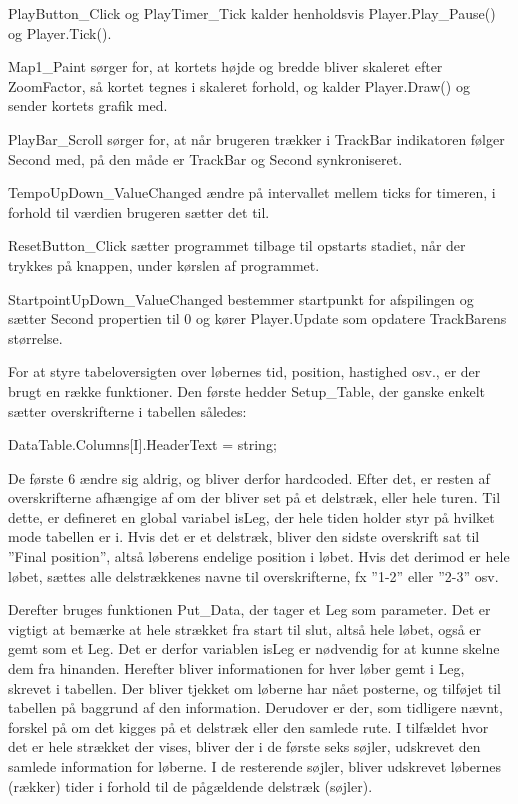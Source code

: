 PlayButton\_Click og PlayTimer\_Tick kalder henholdsvis Player.Play\_Pause() og Player.Tick().

Map1\_Paint sørger for, at kortets højde og bredde bliver skaleret efter ZoomFactor, så kortet tegnes i skaleret forhold, og kalder Player.Draw() og sender kortets grafik med.

PlayBar\_Scroll sørger for, at når brugeren trækker i TrackBar indikatoren følger Second med, på den måde er TrackBar og Second synkroniseret.

TempoUpDown\_ValueChanged ændre på intervallet mellem ticks for timeren, i forhold til værdien brugeren sætter det til. 

ResetButton\_Click sætter programmet tilbage til opstarts stadiet, når der trykkes på knappen, under kørslen af programmet. 

StartpointUpDown\_ValueChanged bestemmer startpunkt for afspilingen og sætter Second propertien til 0 og kører Player.Update som opdatere TrackBarens størrelse.

For at styre tabeloversigten over løbernes tid, position, hastighed osv., er der brugt en række funktioner. 
Den første hedder Setup\_Table, der ganske enkelt sætter overskrifterne i tabellen således:

DataTable.Columns[I].HeaderText = string;

De første 6 ændre sig aldrig, og bliver derfor hardcoded. Efter det, er resten af overskrifterne afhængige af om der bliver set på et delstræk, eller hele turen.  Til dette, er defineret en global variabel isLeg, der hele tiden holder styr på hvilket mode tabellen er i. Hvis det er et delstræk, bliver den sidste overskrift sat til ”Final position”, altså løberens endelige position i løbet. Hvis det derimod er hele løbet, sættes alle delstrækkenes navne til overskrifterne, fx ”1-2” eller ”2-3” osv. 

Derefter bruges funktionen Put\_Data, der tager et Leg som parameter. Det er vigtigt at bemærke at hele strækket fra start til slut, altså hele løbet, også er gemt som et Leg. Det er derfor variablen isLeg er nødvendig for at kunne skelne dem fra hinanden. Herefter bliver informationen for hver løber gemt i Leg, skrevet i tabellen. Der bliver tjekket om løberne har nået posterne, og tilføjet til tabellen på baggrund af den information. Derudover er der, som tidligere nævnt, forskel på om det kigges på et delstræk eller den samlede rute. I tilfældet hvor det er hele strækket der vises, bliver der i de første seks søjler, udskrevet den samlede information for løberne. I de resterende søjler, bliver udskrevet løbernes (rækker) tider i forhold til de pågældende delstræk  (søjler).

